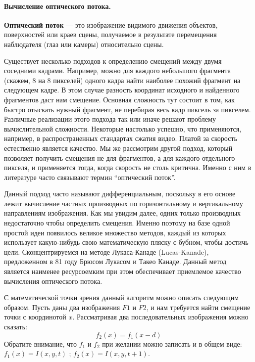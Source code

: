 \paragraph{Вычисление оптического потока.}

\textbf{Оптический поток} — это изображение видимого движения объектов, поверхностей или краев сцены, получаемое в результате перемещения наблюдателя (глаз или камеры) относительно сцены\cite{wikiOpticalFlow}.

Существует несколько подходов к определению смещений между двумя соседними кадрами. Например, можно для каждого небольшого фрагмента (скажем, 8 на 8 пикселей) одного кадра найти наиболее похожий фрагмент на следующем кадре. В этом случае разность координат исходного и найденного фрагментов даст нам смещение. Основная сложность тут состоит в том, как быстро отыскать нужный фрагмент, не перебирая весь кадр пиксель за пикселем. Различные реализации этого подхода так или иначе решают проблему вычислительной сложности. Некоторые настолько успешно, что применяются, например, в распространенных стандартах сжатия видео. Платой за скорость естественно является качество. Мы же рассмотрим другой подход, который позволяет получить смещения не для фрагментов, а для каждого отдельного пикселя, и применяется тогда, когда скорость не столь критична. Именно с ним в литературе часто связывают термин “оптический поток”.

Данный подход часто называют дифференциальным, поскольку в его основе лежит вычисление частных производных по горизонтальному и вертикальному направлениям изображения. Как мы увидим далее, одних только производных недостаточно чтобы определить смещения. Именно поэтому на базе одной простой идеи появилось великое множество методов, каждый из которых использует какую-нибудь свою математическую пляску с бубном, чтобы достичь цели. Сконцентрируемся на методе Лукаса-Канаде (Lucas-Kanade), предложенном в 81 году Брюсом Лукасом и Такео Канаде. Данный метод является наименее ресурсоемким  \cite{habrOpticalFlowAbout} при этом обеспечивает приемлемое качество вычисления оптического потока. 

С математической точки зрения данный алгоритм можно описать следующим образом.
Пусть даны два изображения $F1$ и $F2$, и нам требуется найти смещение точки с координотой $x$. Рассматривая два последовательных изображения можно сказать:
$$ f_2(x) = f_1 (x-d)$$
Обратите внимание, что $f_1$ и $f_2$ при желании можно записать и в общем виде: $f_1(x) = I (x, y, t)$ ; $f_2(x) = I (x, y, t+1)$.

